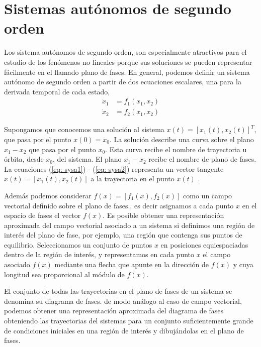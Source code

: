 \section{Sistemas autónomos de segundo orden}
Los sistema autónomos de segundo orden, son especialmente atractivos para el estudio de los fenómenos no lineales porque sus soluciones se pueden representar fácilmente en el llamado plano de fases.
En general, podemos definir un sistema autónomo de segundo orden a partir de dos ecuaciones escalares, una para la derivada temporal de cada estado,
\begin{align}
\dot x_1 &= f_1(x_1,x_2) \label{eq: sysa1}\\
\dot x_2 &= f_2(x_1,x_2) \label{eq: sysa2}
\end{align}

Supongamos que conocemos una solución al sistema $x(t) = [x_1(t),x_2(t)]^T$, que pasa por el punto $x(0) = x_0$. La solución describe una curva sobre el plano $x_1-x_2$ que pasa por el punto $x_0$. Esta curva recibe el nombre de trayectoria u órbita, desde $x_0$, del sistema. El plano $x_1-x_2$ recibe el nombre de plano de fases. La ecuaciones (\ref{eq: sysa1}) - (\ref{eq: sysa2}) representa un vector tangente $\dot x(t) = [\dot x_1(t),\dot x_2(t)]$ a la trayectoria en el punto $x(t)$ .

Además podemos considerar $f(x)=[f_1(x),f_2(x)]$ como un campo vectorial definido sobre el plano de fases., es decir asignamos a cada punto $x$ en el espacio de fases el vector $f(x)$. Es posible obtener una representación aproximada del campo vectorial asociado a un sistema si definimos una región de interés del plano de fase, por ejemplo, una región que contenga sus puntos de equilibrio. Seleccionamos un conjunto de puntos $x$ en posiciones equiespaciadas dentro de la región de interés, y representamos en cada punto $x$ el campo asociado $f(x)$ mediante una flecha que apunte en la dirección de $f(x)$ y cuya longitud sea proporcional al módulo de $f(x)$.

El conjunto de todas las trayectorias en el plano de fases de un sistema se denomina su diagrama de fases. de modo análogo al caso de campo vectorial, podemos obtener una representación aproximada del diagrama de fases obteniendo las trayectorias del sistemas para un conjunto suficientemente grande de condiciones iniciales en una región de interés y dibujándolas en el plano de fases.

